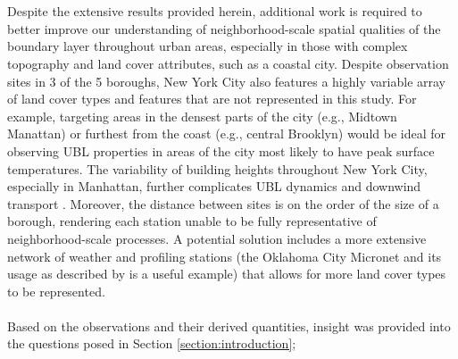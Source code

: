 \\ \\
Despite the extensive results provided herein, additional work is required to better improve our understanding of neighborhood-scale spatial qualities of the boundary layer throughout urban areas, especially in those with complex topography and land cover attributes, such as a coastal city. Despite observation sites in 3 of the 5 boroughs, New York City also features a highly variable array of land cover types and features that are not represented in this study. For example, targeting areas in the densest parts of the city (e.g., Midtown Manattan) or furthest from the coast (e.g., central Brooklyn) would be ideal for observing UBL properties in areas of the city most likely to have peak surface temperatures. The variability of building heights throughout New York City, especially in Manhattan, further complicates UBL dynamics and downwind transport \citep{hanna2006, hanna2007}. Moreover, the distance between sites is on the order of the size of a borough, rendering each station unable to be fully representative of neighborhood-scale processes. A potential solution includes a more extensive network of weather and profiling stations (the Oklahoma City Micronet and its usage as described by \citet{basara2010} is a useful example) that allows for more land cover types to be represented.
\\ \\
Based on the observations and their derived quantities, insight was provided into the questions posed in Section \ref{section:introduction};

